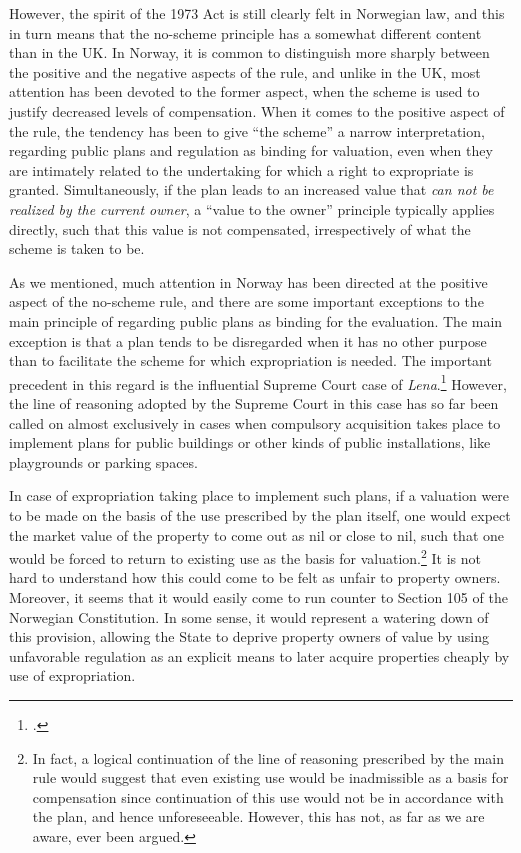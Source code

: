 However, the spirit of the 1973 Act is still clearly felt in Norwegian law, and this in turn means that the no-scheme principle has a somewhat different content than in the UK. In Norway, it is common to distinguish more sharply between the positive and the negative aspects of the rule, and unlike in the UK, most attention has been devoted to the former aspect, when the scheme is used to justify decreased levels of compensation. When it comes to the positive aspect of the rule, the tendency has been to give ``the scheme'' a narrow interpretation, regarding public plans and regulation as binding for valuation, even when they are intimately related to the undertaking for which a right to expropriate is granted. Simultaneously, if the plan leads to an increased value that \emph{can not be realized by the current owner}, a ``value to the owner'' principle typically applies directly, such that this value is not compensated, irrespectively of what the scheme is taken to be.

As we mentioned, much attention in Norway has been directed at the positive aspect of the no-scheme rule, and there are some important exceptions to the main principle of regarding public plans as binding for the evaluation. The main exception is that a plan tends to be disregarded when it has no other purpose than to facilitate the scheme for which expropriation is needed. The important precedent in this regard is the influential Supreme Court case of \emph{Lena}.\footnote{\cite{lena96}.} However, the line of reasoning adopted by the Supreme Court in this case has so far been called on almost exclusively in cases when compulsory acquisition takes place to implement plans for public buildings or other kinds of public installations, like playgrounds or parking spaces.

In case of expropriation taking place to implement such plans, if a valuation were to be made on the basis of the use prescribed by the plan itself, one would expect the market value of the property to come out as nil or close to nil, such that one would be forced to return to existing use as the basis for valuation.\footnote{In fact, a logical continuation of the line of reasoning prescribed by the main rule would suggest that even existing use would be inadmissible as a basis for compensation since continuation of this use would not be in accordance with the plan, and hence unforeseeable. However, this has not, as far as we are aware, ever been argued.} It is not hard to understand how this could come to be felt as unfair to property owners. Moreover, it seems that it would easily come to run counter to Section 105 of the Norwegian Constitution. In some sense, it would represent a watering down of this provision, allowing the State to deprive property owners of value by using unfavorable regulation as an explicit means to later acquire properties cheaply by use of expropriation.

